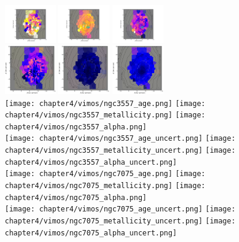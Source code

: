 \begin{figure}
	\centering
	\includegraphics[width=0.2\textwidth]{chapter4/vimos/ngc3100_age.png}
	\includegraphics[width=0.2\textwidth]{chapter4/vimos/ngc3100_metallicity.png}
	\includegraphics[width=0.2\textwidth]{chapter4/vimos/ngc3100_alpha.png}
	\\
	\includegraphics[width=0.2\textwidth]{chapter4/vimos/ngc3100_age_uncert.png}
	\includegraphics[width=0.2\textwidth]{chapter4/vimos/ngc3100_metallicity_uncert.png}
	\includegraphics[width=0.2\textwidth]{chapter4/vimos/ngc3100_alpha_uncert.png}
	\\
	\texttt{[image: chapter4/vimos/ngc3557\_age.png]}
	\texttt{[image: chapter4/vimos/ngc3557\_metallicity.png]}
	\texttt{[image: chapter4/vimos/ngc3557\_alpha.png]}
	\\
	\texttt{[image: chapter4/vimos/ngc3557\_age\_uncert.png]}
	\texttt{[image: chapter4/vimos/ngc3557\_metallicity\_uncert.png]}
	\texttt{[image: chapter4/vimos/ngc3557\_alpha\_uncert.png]}
	\\
	\texttt{[image: chapter4/vimos/ngc7075\_age.png]}
	\texttt{[image: chapter4/vimos/ngc7075\_metallicity.png]}
	\texttt{[image: chapter4/vimos/ngc7075\_alpha.png]}
	\\
	\texttt{[image: chapter4/vimos/ngc7075\_age\_uncert.png]}
	\texttt{[image: chapter4/vimos/ngc7075\_metallicity\_uncert.png]}
	\texttt{[image: chapter4/vimos/ngc7075\_alpha\_uncert.png]}
	\\
\end{figure}

